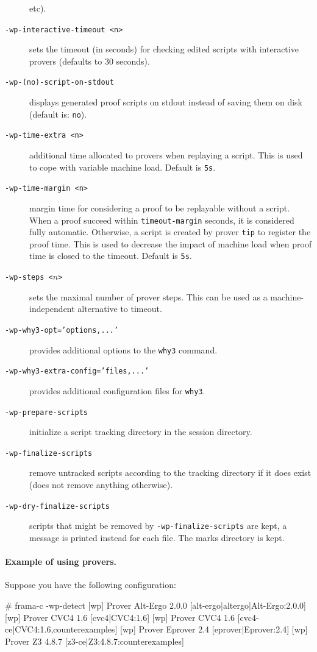 \begin{description}
  etc).
\item[\tt -wp-interactive-timeout <n>] sets the timeout (in seconds) for checking
  edited scripts with interactive provers (defaults to 30 seconds).
\item[\tt -wp-(no)-script-on-stdout] displays generated proof scripts on stdout
  instead of saving them on disk (default is: \texttt{no}).
\item[\tt -wp-time-extra <n>] additional time allocated to provers when
  replaying a script. This is used to cope with variable machine load.
  Default is \verb+5s+.
\item[\tt -wp-time-margin <n>] margin time for considering a proof to be
  replayable without a script. When a proof succeed within \verb+timeout-margin+
  seconds, it is considered fully automatic. Otherwise, a script is created
  by prover \verb+tip+ to register the proof time. This is used to decrease the
  impact of machine load when proof time is closed to the timeout.
  Default is \verb+5s+.
\item[\tt -wp-steps <$n$>] sets the maximal number of prover
  steps. This can be used as a machine-independent alternative to timeout.
\item[\tt -wp-why3-opt='options,...'] provides additional options to the
  \verb+why3+ command.
\item[\tt -wp-why3-extra-config='files,...'] provides additional configuration
  files for \verb+why3+.
\item[\tt -wp-prepare-scripts] initialize a script tracking directory in the
  session directory.
\item[\tt -wp-finalize-scripts] remove untracked scripts according to the
  tracking directory if it does exist (does not remove anything otherwise).
\item[\tt -wp-dry-finalize-scripts] scripts that might be removed by
  \verb+-wp-finalize-scripts+ are kept, a message is printed instead for each
  file. The marks directory is kept.
\end{description}

\paragraph{Example of using provers.}
Suppose you have the following configuration:

\begin{logs}
# frama-c -wp-detect
[wp] Prover   Alt-Ergo 2.0.0  [alt-ergo|altergo|Alt-Ergo:2.0.0]
[wp] Prover       CVC4 1.6    [cvc4|CVC4:1.6]
[wp] Prover       CVC4 1.6    [cvc4-ce|CVC4:1.6,counterexamples]
[wp] Prover    Eprover 2.4    [eprover|Eprover:2.4]
[wp] Prover         Z3 4.8.7  [z3-ce|Z3:4.8.7:counterexamples]
\end{logs}

